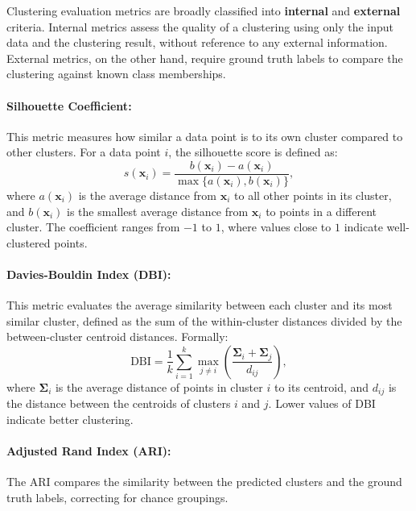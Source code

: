 Clustering evaluation metrics are broadly classified into \textbf{internal} and
\textbf{external} criteria. Internal metrics assess the quality of a clustering
using only the input data and the clustering result, without reference to any
external information. External metrics, on the other hand, require ground truth
labels to compare the clustering against known class memberships.

\paragraph{Silhouette Coefficient:} This metric measures how similar a data point is to its own cluster compared to
other clusters. For a data point $i$, the silhouette score is defined as:
\begin{equation}
    s(\mathbf{x}_i) = \frac{b(\mathbf{x}_i) - a(\mathbf{x}_i)}{\max\{a(\mathbf{x}_i), b(\mathbf{x}_i)\}},
\end{equation}
where $a(\mathbf{x}_i)$ is the average distance from $\mathbf{x}_i$ to all other points in its
cluster, and $b(\mathbf{x}_i)$ is the smallest average distance from $\mathbf{x}_i$ to points in a
different cluster. The coefficient ranges from $-1$ to $1$, where values close
to $1$ indicate well-clustered points.

\paragraph{Davies-Bouldin Index (DBI):} This metric evaluates the average similarity between each cluster and its most
similar cluster, defined as the sum of the within-cluster distances divided by
the between-cluster centroid distances. Formally:
\begin{equation}
    \text{DBI} = \frac{1}{k} \sum_{i=1}^{k} \max_{j \ne i} \left( \frac{\mathbf{\Sigma}_i + \mathbf{\Sigma}_j}{d_{ij}} \right),
\end{equation}
where $\mathbf{\Sigma}_i$ is the average distance of points in cluster $i$ to its
centroid, and $d_{ij}$ is the distance between the centroids of clusters $i$
and $j$. Lower values of DBI indicate better clustering.

\paragraph{Adjusted Rand Index (ARI):} The ARI compares the similarity between the predicted clusters and the ground
truth labels, correcting for chance groupings.

